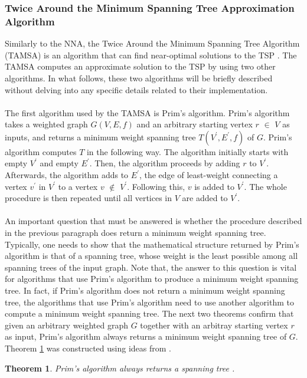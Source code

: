 \documentclass[12pt]{article}
\newtheorem{theorem}[definition]{Theorem}
\numberwithin{equation}{subsection}
\numberwithin{table}{subsection}
\numberwithin{algorithm}{subsection}
\begin{document}
\subsubsection{Twice Around the Minimum Spanning Tree Approximation Algorithm}
\label{TAMSA_SECTION}
Similarly to the NNA, the Twice Around the Minimum Spanning Tree Algorithm (TAMSA) is an algorithm that can find near-optimal solutions to the TSP \cite{cormen_leiserson_rivest_stein}. The TAMSA computes an approximate solution to the TSP by using two other algorithms. In what follows, these two algorithms will be briefly described without delving into any specific details related to their implementation.\\\\
The first algorithm used by the TAMSA is Prim's algorithm. Prim's algorithm takes a weighted graph $G(V,E,f)$ and an arbitrary starting vertex $r$ $\in$ $V$ as inputs, and returns a minimum weight spanning tree $T(V^\prime,E^\prime,f)$ of $G$. Prim's algorithm computes $T$ in the following way. The algorithm initially starts with empty $V^\prime$ and empty $E^\prime$. Then, the algorithm proceeds by adding $r$ to $V^\prime$. Afterwards, the algorithm adds to $E^\prime$, the edge of least-weight connecting a vertex $v^\prime$ in $V^\prime$ to a vertex $v$ $\notin$ $V^\prime$. Following this, $v$ is added to $V^\prime$. The whole procedure is then repeated until all vertices in $V$ are added to $V^\prime$. \cite{harris_hirst_mossinghoff_2008}\\\\
An important question that must be answered is whether the procedure described in the previous paragraph does return a minimum weight spanning tree. Typically, one needs to show that the mathematical structure returned by Prim's algorithm is that of a spanning tree, whose weight is the least possible among all spanning trees of the input graph. Note that, the answer to this question is vital for algorithms that use Prim's algorithm to produce a minimum weight spanning tree. In fact, if Prim's algorithm does not return a minimum weight spanning tree, the algorithms that use Prim's algorithm need to use another algorithm to compute a minimum weight spanning tree. The next two theorems confirm that given an arbitrary weighted graph $G$ together with an arbitray starting vertex $r$ as input, Prim's algorithm always returns a minimum weight spanning tree of $G$. Theorem \ref{correctness1} was constructed using ideas from \cite{prim's_algorithm}.
\begin{theorem}
\label{correctness1}
Prim's algorithm always returns a spanning tree {}.
\end{theorem}
\end{document}
